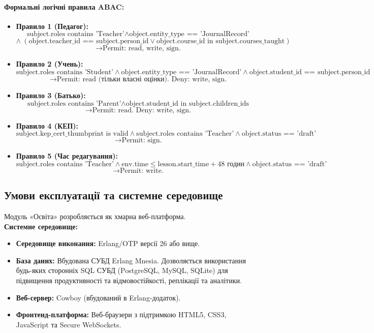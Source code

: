 \documentclass{article}
\begin{document}
\paragraph{Формальні логічні правила ABAC:}
\begin{itemize}
    \item \textbf{Правило 1 (Педагог):}
    $$\text{subject.roles contains 'Teacher'} \land \text{object.entity\_type == 'JournalRecord'}$$
    $$\land\ (\text{object.teacher\_id == subject.person\_id} \lor \text{object.course\_id in subject.courses\_taught})$$
    $$\rightarrow \text{Permit: read, write, sign.}$$
    \item \textbf{Правило 2 (Учень):}
    $$\text{subject.roles contains 'Student'} \land \text{object.entity\_type == 'JournalRecord'} \land \text{object.student\_id == subject.person\_id}$$
    $$\rightarrow \text{Permit: read (тільки власні оцінки). Deny: write, sign.}$$
    \item \textbf{Правило 3 (Батько):}
    $$\text{subject.roles contains 'Parent'} \land \text{object.student\_id in subject.children\_ids}$$
    $$\rightarrow \text{Permit: read. Deny: write, sign.}$$
    \item \textbf{Правило 4 (КЕП):}
    $$\text{subject.kep\_cert\_thumbprint is valid} \land \text{subject.roles contains 'Teacher'} \land \text{object.status == 'draft'}$$
    $$\rightarrow \text{Permit: sign.}$$
    \item \textbf{Правило 5 (Час редагування):}
    $$\text{subject.roles contains 'Teacher'} \land \text{env.time} \le \text{lesson.start\_time} + 48\text{ годин} \land \text{object.status == 'draft'}$$
    $$\rightarrow \text{Permit: write.}$$
\end{itemize}

\subsection{Умови експлуатації та системне середовище}
Модуль «Освіта» розробляється як хмарна веб-платформа.
\\
\textbf{Системне середовище:}
\begin{itemize}
    \item \textbf{Середовище виконання:} Erlang/OTP версії 26 або вище.
    \item \textbf{База даних:} Вбудована СУБД Erlang Mnesia. Дозволяється використання будь-яких сторонніх SQL СУБД (PostgreSQL, MySQL, SQLite) для підвищення продуктивності та відмовостійкості, реплікації та аналітики.
    \item \textbf{Веб-сервер:} Cowboy (вбудований в Erlang-додаток).
    \item \textbf{Фронтенд-платформа:} Веб-браузери з підтримкою HTML5, CSS3, JavaScript та Secure WebSockets.
\end{itemize}
\end{document}
